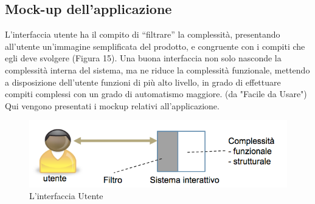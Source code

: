 \subsection{Mock-up dell'applicazione}
    \begin{flushleft}
       
        L'interfaccia utente  ha il compito di “filtrare” la complessità, presentando all'utente un'immagine semplificata del prodotto, e congruente con i compiti che egli deve
        svolgere (Figura 15). Una buona interfaccia non solo nasconde la complessità interna del sistema, ma ne riduce la
        complessità funzionale, mettendo a disposizione dell'utente funzioni di più alto livello, in grado di effettuare compiti
        complessi con un grado di automatismo maggiore. (da "Facile da Usare")
        Qui vengono presentati i mockup relativi all'applicazione.

         \begin{figure}[H]
          \centering
          \includegraphics[scale=0.5]{assets/immagini varie/interfaccia utente.png}
          \caption{L'interfaccia Utente}\label{fig:interfaccia utente}
        \end{figure}

    \end{flushleft}

